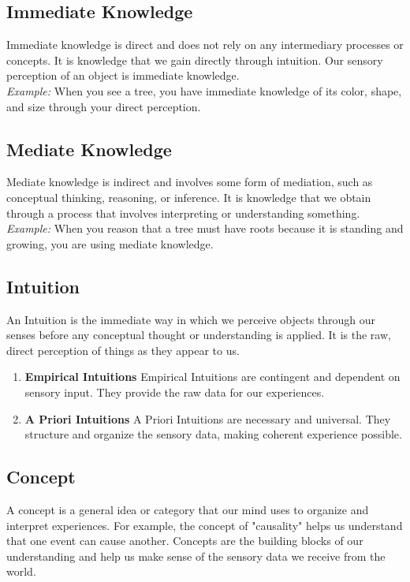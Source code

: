 \documentclass[a4paper]{article}
\begin{document}
\subsection{Immediate Knowledge}
Immediate knowledge is direct and does not rely on any intermediary processes or concepts. It is knowledge that we gain directly through intuition.
Our sensory perception of an object is immediate knowledge. \\

\textit{Example:} When you see a tree, you have immediate knowledge of its color, shape, and size through your direct perception.

\subsection{Mediate Knowledge}
Mediate knowledge is indirect and involves some form of mediation, such as conceptual thinking, reasoning, or inference. 
It is knowledge that we obtain through a process that involves interpreting or understanding something. \\

\textit{Example:}  When you reason that a tree must have roots because it is standing and growing, you are using mediate knowledge. 

\subsection{Intuition}
An Intuition is the immediate way in which we perceive objects through our senses before any conceptual thought or understanding is applied. 
It is the raw, direct perception of things as they appear to us.

\begin{enumerate}
    \item \textbf{Empirical Intuitions} Empirical Intuitions are contingent and dependent on sensory input. They provide the raw data for our experiences.
    \item \textbf{A Priori Intuitions} A Priori Intuitions are necessary and universal. They structure and organize the sensory data, making coherent experience possible.
\end{enumerate}


\subsection{Concept}
A concept is a general idea or category that our mind uses to organize and interpret experiences. 
For example, the concept of "causality" helps us understand that one event can cause another. 
Concepts are the building blocks of our understanding and help us make sense of the sensory data we receive from the world.
\end{document}
